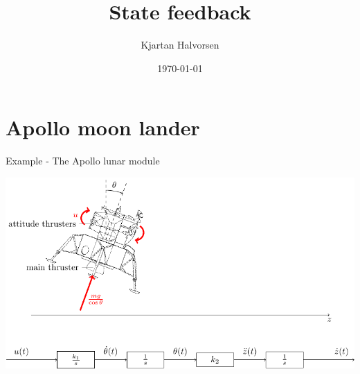 \documentclass[presentation,aspectratio=1610]{beamer}
\author{Kjartan Halvorsen}
\date{\today}
\title{State feedback}
\begin{document}
\maketitle

\section{Apollo moon lander}
\label{sec:orga06b02f}
\begin{frame}[label={sec:orgf6d7efd}]{Example - The Apollo lunar module}
\begin{center}
\includegraphics[width=\linewidth]{fig-apollo}
\end{center}
\end{frame}
\end{document}
